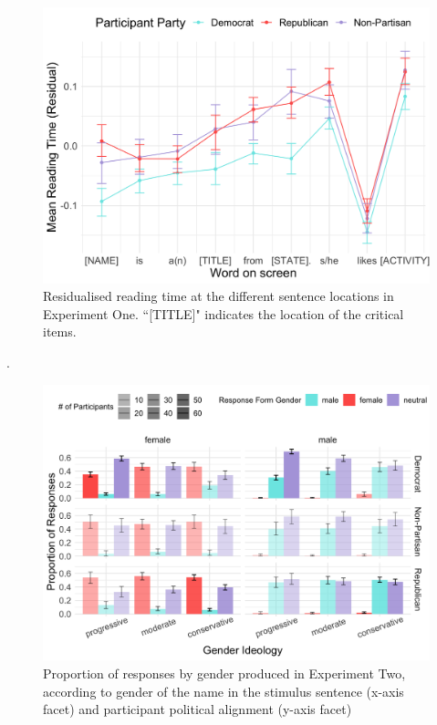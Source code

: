 \documentclass[10pt,letterpaper]{article}
\begin{document}
	
 	\begin{figure}[h]
 	\centering
 	\includegraphics[scale=0.18]{sprt-neutral-all-regions-poli-party.png}
 	\caption{Residualised reading time at the different sentence locations in Experiment One. ``[TITLE]" indicates the location of the critical items.}
 \end{figure}

\newpage
   . 
\newpage
 
 	\begin{figure}[h]
 	\centering
 	\includegraphics[scale=0.2]{prod-3x2x3.png}
 	\caption{Proportion of responses by gender produced in Experiment Two, according to gender of the name in the stimulus sentence (x-axis facet) and participant political alignment (y-axis facet)}
 \end{figure}
\end{document}
